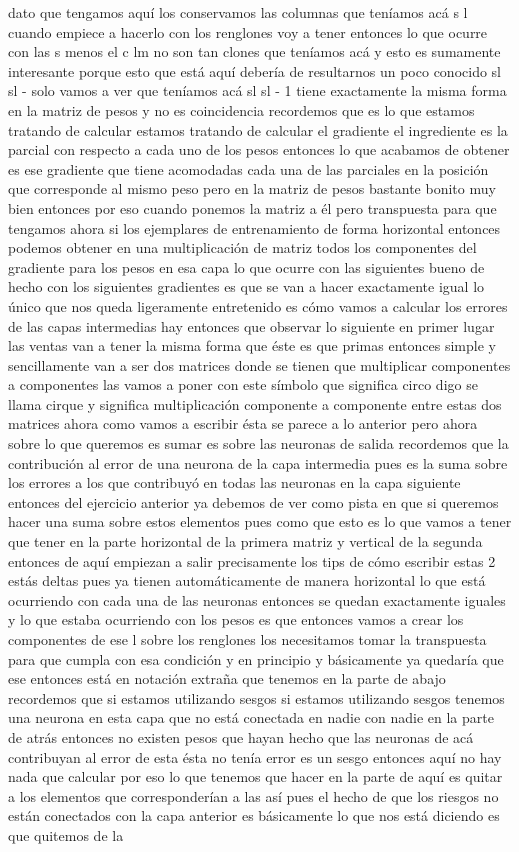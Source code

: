 dato que tengamos aquí los conservamos las columnas que teníamos acá s l cuando empiece a hacerlo con los renglones voy a tener entonces lo que ocurre con las s menos el c lm no son tan clones que teníamos acá y esto es sumamente interesante porque esto que está aquí debería de resultarnos un poco conocido sl sl - solo vamos a ver que teníamos acá sl sl - 1 tiene exactamente la misma forma en la matriz de pesos y no es coincidencia recordemos que es lo que estamos tratando de calcular estamos tratando de calcular el gradiente el ingrediente es la parcial con respecto a cada uno de los pesos entonces lo que acabamos de obtener es ese gradiente que tiene acomodadas cada una de las parciales en la posición que corresponde al mismo peso pero en la matriz de pesos bastante bonito muy bien entonces por eso cuando ponemos la matriz a él pero transpuesta para que tengamos ahora si los ejemplares de entrenamiento de forma horizontal entonces podemos obtener en una multiplicación de matriz todos los componentes del gradiente para los pesos en esa capa lo que ocurre con las siguientes bueno de hecho con los siguientes gradientes es que se van a hacer exactamente igual lo único que nos queda ligeramente entretenido es cómo vamos a calcular los errores de las capas intermedias hay entonces que observar lo siguiente en primer lugar las ventas van a tener la misma forma que éste es que primas entonces simple y sencillamente van a ser dos matrices donde se tienen que multiplicar componentes a componentes las vamos a poner con este símbolo que significa circo digo se llama cirque y significa multiplicación componente a componente entre estas dos matrices ahora como vamos a escribir ésta se parece a lo anterior pero ahora sobre lo que queremos es sumar es sobre las neuronas de salida recordemos que la contribución al error de una neurona de la capa intermedia pues es la suma sobre los errores a los que contribuyó en todas las neuronas en la capa siguiente entonces del ejercicio anterior ya debemos de ver como pista en que si queremos hacer una suma sobre estos elementos pues como que esto es lo que vamos a tener que tener en la parte horizontal de la primera matriz y vertical de la segunda entonces de aquí empiezan a salir precisamente los tips de cómo escribir estas 2 estás deltas pues ya tienen automáticamente de manera horizontal lo que está ocurriendo con cada una de las neuronas entonces se quedan exactamente iguales y lo que estaba ocurriendo con los pesos es que entonces vamos a crear los componentes de ese l sobre los renglones los necesitamos tomar la transpuesta para que cumpla con esa condición y en principio y básicamente ya quedaría que ese entonces está en notación extraña que tenemos en la parte de abajo recordemos que si estamos utilizando sesgos si estamos utilizando sesgos tenemos una neurona en esta capa que no está conectada en nadie con nadie en la parte de atrás entonces no existen pesos que hayan hecho que las neuronas de acá contribuyan al error de esta ésta no tenía error es un sesgo entonces aquí no hay nada que calcular por eso lo que tenemos que hacer en la parte de aquí es quitar a los elementos que corresponderían a las así pues el hecho de que los riesgos no están conectados con la capa anterior es básicamente lo que nos está diciendo es que quitemos de la 
